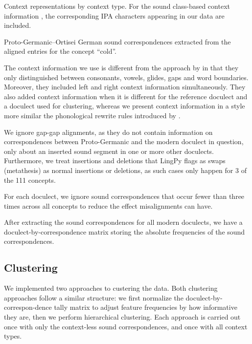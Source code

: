 \documentclass[a4paper]{article}
\begin{document}
\begin{table}[t]

\caption
[Context representations by context type]
{Context representations by context type.
For the sound class-based context information
\citep{list2012sca}, the corresponding IPA characters
appearing in our data are included.}
\label{tab:context}
\end{table}

\begin{table}[b!]

\caption{
Proto-Germanic--Ortisei German sound correspondences
extracted from the aligned entries for the concept ``cold''.}
\label{tab:corres}
\end{table}

\FloatBarrier

The context information we use is different from the approach
by \citet{montemagni2013synchronic} in that they only
distinguished between consonants, vowels, glides, gaps and word boundaries.
Moreover, they included left and right context information simultaneously.
They also added context information when it is different for
the reference doculect and a doculect used for clustering,
whereas we present context information in a style
more similar the phonological rewrite rules introduced by \citet{chomsky1968sound}.

We ignore gap-gap alignments,
as they do not contain information on correspondences
between Proto-Germanic and the modern doculect in question,
only about an inserted sound segment in one or more other doculects.
Furthermore, we treat insertions and deletions
that LingPy flags as swaps (metathesis) as normal insertions or deletions,
as such cases only happen for 3 of the 111 concepts.

For each doculect, we ignore sound correspondences
that occur fewer than three times across all concepts
to reduce the effect misalignments can have. 

After extracting the sound correspondences for
all modern doculects, we have a doculect-by-correspondence
matrix storing the absolute frequencies of the sound correspondences.



\subsection{Clustering}
\label{subsec:clustering}

We implemented two approaches to custering the data.
Both clustering approaches follow a similar structure:
we first normalize the doculect-by-correspon-dence tally matrix
to adjust feature frequencies by how informative they are,
then we perform hierarchical clustering.
Each approach is carried out once with only
the context-less sound correspondences,
and once with all context types.
\end{document}
